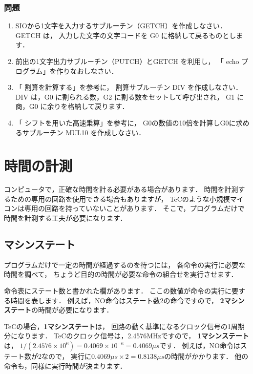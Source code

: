 \vfill
\subsubsection{問題}
\begin{enumerate}
\item SIOから1文字を入力するサブルーチン（GETCH）を作成しなさい．
GETCH は，
入力した文字の文字コードを G0 に格納して戻るものとします．
\item 前出の1文字出力サブルーチン（PUTCH）とGETCH を利用し，
「 echo プログラム」を作りなおしなさい．
\item 「 割算を計算する」を参考に，
割算サブルーチン DIV を作成しなさい．
DIV は，G0 に割られる数，G2 に割る数をセットして呼び出され，
G1 に商，G0 に余りを格納して戻ります．
\item 「 シフトを用いた高速乗算」を参考に，
G0の数値の10倍を計算しG0に求めるサブルーチン MUL10 を作成しなさい．
\end{enumerate}
\vfill

\newpage
\section{時間の計測}

コンピュータで，正確な時間を計る必要がある場合があります．
時間を計測するための専用の回路を使用できる場合もありますが，
TeCのような小規模マイコンは専用の回路を持っていないことがあります．
そこで，プログラムだけで時間を計測する工夫が必要になります．

\subsection{マシンステート}

プログラムだけで一定の時間が経過するのを待つには，
各命令の実行に必要な時間を調べて，
ちょうど目的の時間が必要な命令の組合せを実行させます．

命令表にステート数と書かれた欄があります．
ここの数値が命令の実行に要する時間を表します．
例えば，NO命令はステート数2の命令ですので，
{\bf 2マシンステート}の時間が必要になります．

TeCの場合，{\bf 1マシンステート}は，
回路の動く基準になるクロック信号の1周期分になります．
TeCのクロック信号は，2.4576MHzですので，
{\bf 1マシンステート}は，
$1/(2.4576\times10^6) = 0.4069\times10^{-6} = 0.4069 \mu s$です．
例えば，NO命令はステート数が2なので，
実行に$0.4069 \mu s \times 2 = 0.8138 \mu s$の時間がかかります．
他の命令も，同様に実行時間が決まります．


